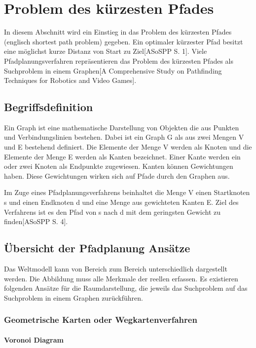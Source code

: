 \chapter{Problem des kürzesten Pfades}

In diesem Abschnitt wird ein Einstieg in das Problem des kürzesten Pfades (englisch shortest path problem) gegeben. Ein optimaler kürzester Pfad besitzt eine möglichst kurze Distanz von Start zu Ziel[ASoSPP S. 1]. Viele Pfadplanungsverfahren repräsentieren das Problem des kürzesten Pfades als Suchproblem in einem Graphen[A Comprehensive Study on Pathfinding Techniques for Robotics and Video Games].

\section{Begriffsdefinition}

Ein Graph ist eine mathematische Darstellung von Objekten die aus Punkten und Verbindungslinien bestehen. Dabei ist ein Graph G als aus zwei Mengen V und E bestehend definiert. Die Elemente der Menge V werden als Knoten und die Elemente der Menge E werden als Kanten bezeichnet. Einer Kante werden ein oder zwei Knoten als Endpunkte zugewiesen. Kanten können Gewichtungen haben. Diese Gewichtungen wirken sich auf Pfade durch den Graphen aus\cite{Gross.2004}. 

Im Zuge eines Pfadplanungsverfahrens beinhaltet die Menge V einen Startknoten s und einen Endknoten d und eine Menge aus gewichteten Kanten E. Ziel des Verfahrens ist es den Pfad von s nach d mit dem geringsten Gewicht zu finden[ASoSPP S. 4]. 

\section{Übersicht der Pfadplanung Ansätze}

Das Weltmodell kann von Bereich zum Bereich unterschiedlich dargestellt werden. Die Abbildung muss alle Merkmale der reellen erfassen.  Es existieren folgenden Ansätze für die Raumdarstellung, die jeweils das Suchproblem auf das Suchproblem in einem Graphen zurückführen.

\subsection{Geometrische Karten oder Wegkartenverfahren}

\subsubsection{Voronoi Diagram}

